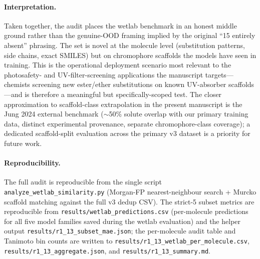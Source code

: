 \documentclass[journal=jcisd8,manuscript=suppinfo]{achemso}
\begin{document}
\paragraph{Interpretation.}
Taken together, the audit places the wetlab benchmark in an honest middle ground rather than the genuine-OOD framing implied by the original ``15 entirely absent'' phrasing. The set is novel at the molecule level (substitution patterns, side chains, exact SMILES) but on chromophore scaffolds the models have seen in training. This is the operational deployment scenario most relevant to the photosafety- and UV-filter-screening applications the manuscript targets---chemists screening new ester/ether substitutions on known UV-absorber scaffolds---and is therefore a meaningful but specifically-scoped test. The closer approximation to scaffold-class extrapolation in the present manuscript is the Jung 2024 external benchmark ($\sim$50\% solute overlap with our primary training data, distinct experimental provenance, separate chromophore-class coverage); a dedicated scaffold-split evaluation across the primary v3 dataset is a priority for future work.

\paragraph{Reproducibility.}
The full audit is reproducible from the single script \texttt{analyze\_wetlab\_similarity.py} (Morgan-FP nearest-neighbour search + Murcko scaffold matching against the full v3 dedup CSV). The strict-5 subset metrics are reproducible from \texttt{results/wetlab\_predictions.csv} (per-molecule predictions for all five model families saved during the wetlab evaluation) and the helper output \texttt{results/r1\_13\_subset\_mae.json}; the per-molecule audit table and Tanimoto bin counts are written to \texttt{results/r1\_13\_wetlab\_per\_molecule.csv}, \texttt{results/r1\_13\_aggregate.json}, and \texttt{results/r1\_13\_summary.md}.
\end{document}
